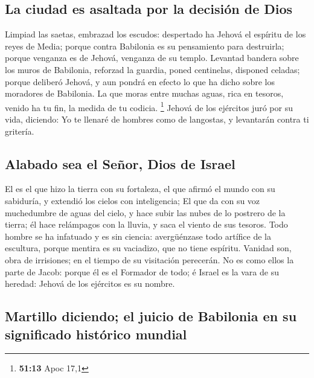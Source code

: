 \hypertarget{la-ciudad-es-asaltada-por-la-decisiuxf3n-de-dios}{%
\subsection{La ciudad es asaltada por la decisión de
Dios}\label{la-ciudad-es-asaltada-por-la-decisiuxf3n-de-dios}}

 Limpiad las saetas, embrazad los escudos: despertado ha
Jehová el espíritu de los reyes de Media; porque contra Babilonia es su
pensamiento para destruirla; porque venganza es de Jehová, venganza de
su templo.  Levantad bandera sobre los muros de Babilonia,
reforzad la guardia, poned centinelas, disponed celadas; porque deliberó
Jehová, y aun pondrá en efecto lo que ha dicho sobre los moradores de
Babilonia.  La que moras entre muchas aguas, rica en
tesoros, venido ha tu fin, la medida de tu codicia. \footnote{\textbf{51:13}
  Apoc 17,1}  Jehová de los ejércitos juró por su vida,
diciendo: Yo te llenaré de hombres como de langostas, y levantarán
contra ti gritería.

\hypertarget{alabado-sea-el-seuxf1or-dios-de-israel}{%
\subsection{Alabado sea el Señor, Dios de
Israel}\label{alabado-sea-el-seuxf1or-dios-de-israel}}

 El es el que hizo la tierra con su fortaleza, el que
afirmó el mundo con su sabiduría, y extendió los cielos con
inteligencia;  El que da con su voz muchedumbre de aguas
del cielo, y hace subir las nubes de lo postrero de la tierra; él hace
relámpagos con la lluvia, y saca el viento de sus tesoros. 
Todo hombre se ha infatuado y es sin ciencia: avergüénzase todo artífice
de la escultura, porque mentira es su vaciadizo, que no tiene espíritu.
 Vanidad son, obra de irrisiones; en el tiempo de su
visitación perecerán.  No es como ellos la parte de Jacob:
porque él es el Formador de todo; é Israel es la vara de su heredad:
Jehová de los ejércitos es su nombre.

\hypertarget{martillo-diciendo-el-juicio-de-babilonia-en-su-significado-histuxf3rico-mundial}{%
\subsection{Martillo diciendo; el juicio de Babilonia en su significado
histórico
mundial}\label{martillo-diciendo-el-juicio-de-babilonia-en-su-significado-histuxf3rico-mundial}}

